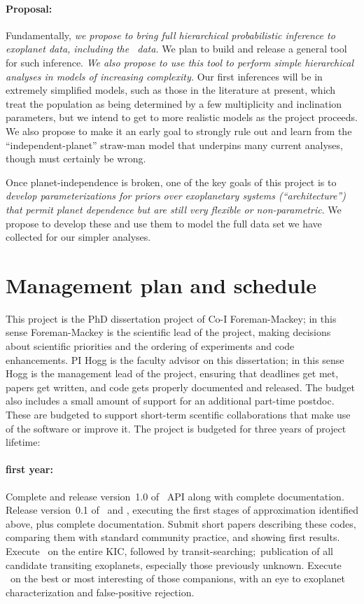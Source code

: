 \documentclass[letterpaper,12pt,preprint]{hack_aastex}
\newcommand{\kplr}{\package{kplr}}
\newcommand{\Untrendy}{\package{Untrendy}}
\newcommand{\Bart}{\package{Bart}}
\begin{document}
\paragraph{Proposal:}
Fundamentally, \emph{we propose to bring full hierarchical
  probabilistic inference to exoplanet data, including the
  \Kepler\ data.}  We plan to build and release a general tool for
such inference.  \emph{We also propose to use this tool to perform
  simple hierarchical analyses in models of increasing complexity.}
Our first inferences will be in extremely simplified models, such as
those in the literature at present, which treat the population as
being determined by a few multiplicity and inclination parameters, but
we intend to get to more realistic models as the project proceeds.  We
also propose to make it an early goal to strongly rule out and learn
from the ``independent-planet'' straw-man model that underpins many
current analyses, though must certainly be wrong.

Once planet-independence is broken, one of the key goals of this
project is to \emph{develop parameterizations for priors over
  exoplanetary systems (``architecture'') that permit planet
  dependence but are still very flexible or non-parametric}.  We
propose to develop these and use them to model the full data set we
have collected for our simpler analyses.


\section{Management plan and schedule}

This project is the PhD dissertation project of Co-I Foreman-Mackey;
in this sense Foreman-Mackey is the scientific lead of the project,
making decisions about scientific priorities and the ordering of
experiments and code enhancements.  PI Hogg is the faculty advisor on
this dissertation; in this sense Hogg is the management lead of the
project, ensuring that deadlines get met, papers get written, and code
gets properly documented and released.  The budget also includes a
small amount of support for an additional part-time 
postdoc.  These are budgeted to support short-term scentific
collaborations that make use of the software or improve it.
The project is budgeted for three years of project lifetime:

\paragraph{first year:}
Complete and release version~1.0 of \kplr\ API along with complete
documentation.
Release version~0.1
of \Untrendy\ and \Bart, executing the first stages of
approximation identified above, plus complete documentation.  Submit short
papers describing these codes, comparing them with standard community
practice, and showing first results.
Execute \Untrendy\ on the entire KIC, followed by transit-searching;\
publication of all candidate transiting exoplanets, especially those
previously unknown.  Execute \Bart\ on the best or most interesting of
those companions, with an eye to exoplanet characterization and
false-positive rejection.
\end{document}
